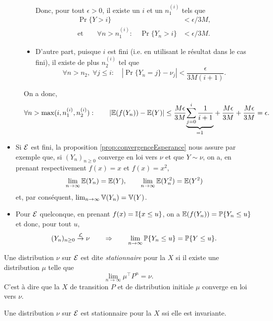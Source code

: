 \begin{description}
\begin{itemize}
  Donc, pour tout $\epsilon > 0$, il existe un $i$ et un $n_1^{(i)}$ tels que 
  \begin{align*}
  \Pr\{Y > i\} & < \epsilon / 3M, \\
  \text{et} \qquad 
  \forall n > n_1^{(i)}: \quad \Pr\{Y_n > i\} & < \epsilon / 3M.
  \end{align*}
  \item D'autre part, puisque $i$ est fini (i.e. en utilisant le résultat dans le cas fini), il existe de plus $n_2^{(i)}$ tel que 
  $$
  \forall n > n_2, \; \forall j \leq i: \quad \left|\Pr\{Y_n=j\} - \nu_j\right| < \frac\epsilon{3M(i+1)}.
  $$
  \end{itemize}
  On a donc, 
 \begin{align*}
   \forall n > \max(i, n_1^{(i)}, n_2^{(i)}): \qquad 
   \left|\operatorname{\mathbb{E}}(f(Y_n)) - \operatorname{\mathbb{E}}(Y)\right| \leq \frac{M\epsilon}{3M} \underset{=1}{\underbrace{\sum_{j=0}^i \frac1{i+1}}} + \frac{M\epsilon}{3M} + \frac{M\epsilon}{3M} = \epsilon.
  \end{align*}
\end{description}
\eproof

\remarks
\begin{itemize}
\item Si $\mathcal{E}$ est fini, la proposition \ref{prop:convergenceEsperance} nous assure par exemple que, si $(Y_n)_{n \geq 0}$ converge en loi vers $\nu$ et que $Y \sim \nu$, on a, en prenant respectivement $f(x) = x$ et $f(x) = x^2$, 
$$
\lim_{n \to \infty} \operatorname{\mathbb{E}}(Y_n) = \operatorname{\mathbb{E}}(Y), \qquad
\lim_{n \to \infty} \operatorname{\mathbb{E}}(Y_n^2) = \operatorname{\mathbb{E}}(Y^2)
$$
et, par conséquent, $\lim_{n \to \infty} \operatorname{\mathbb{V}}(Y_n) = \operatorname{\mathbb{V}}(Y)$. 
\item Pour $\mathcal{E}$ quelconque, en prenant $f(x) = \mathbb{I}\{x \leq u\}$, on a $\operatorname{\mathbb{E}}(f(Y_n)) = \operatorname{\mathbb{P}}\{Y_n \leq u\}$ et donc, pour tout $u$, 
$$
(Y_n)_{n \geq 0} \overset{\mathcal{L}}{\rightarrow} \nu
\qquad \Rightarrow \qquad
\lim_{n \to \infty} \operatorname{\mathbb{P}}\{Y_n \leq u\} = \operatorname{\mathbb{P}}\{Y \leq u\}.
$$
\end{itemize}

\begin{definition}
  Une distribution $\nu$ sur $\mathcal{E}$ est dite \emph{stationnaire} pour la \cM $X$ si il existe une distribution $\mu$ telle que 
  $$
  \lim_{n \to \infty} \mu^\top P^n = \nu.
  $$
  C'est à dire que la \cM $X$ de transition $P$ et de distribution initiale $\mu$ converge en loi vers $\nu$.
\end{definition}

\begin{proposition} \label{prop:stationnaireInvariante}
  Une distribution $\nu$ sur $\mathcal{E}$ est stationnaire pour la \cM $X$ ssi elle est invariante.
\end{proposition}

